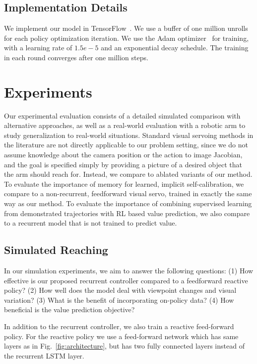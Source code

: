 \documentclass[10pt,twocolumn,letterpaper]{article}
\begin{document}
\subsection{Implementation Details}

We implement our model in TensorFlow~\cite{abadi2016tensorflow}. We use a buffer of one million unrolls for each policy optimization iteration. We use the Adam optimizer~\cite{kingma2014adam} for training, with a learning rate of $1.5e-5$ and an exponential decay schedule. The training in each round converges after one million steps.


\section{Experiments}\label{sec:experiments}
Our experimental evaluation consists of a detailed simulated comparison with alternative approaches, as well as a real-world evaluation with a robotic arm to study generalization to real-world situations. Standard visual servoing methods in the literature are not directly applicable to our problem setting, since we do not assume knowledge about the camera position or the action to image Jacobian, and the goal is specified simply by providing a picture of a desired object that the arm should reach for. Instead, we compare to ablated variants of our method. To evaluate the importance of memory for learned, implicit self-calibration, we compare to a non-recurrent, feedforward visual servo, trained in exactly the same way as our method. To evaluate the importance of combining supervised learning from demonstrated trajectories with RL based value prediction, we also compare to a recurrent model that is not trained to predict value. 

\subsection{Simulated Reaching}

In our simulation experiments, we aim to answer the following questions: (1) How effective is our proposed recurrent controller compared to a feedforward reactive policy? (2) How well does the model deal with viewpoint changes and visual variation? (3) What is the benefit of incorporating on-policy data? (4) How beneficial is the value prediction objective?

 In addition to the recurrent controller, we also train a reactive feed-forward policy. For the reactive policy we use a feed-forward network which has same layers as in Fig.~\ref{fig:architecture}, but has two fully connected layers instead of the recurrent LSTM layer.
\end{document}
